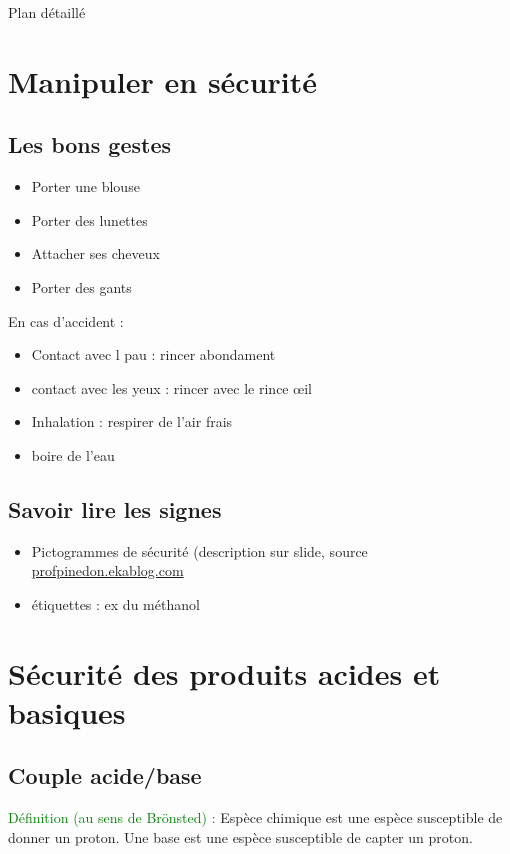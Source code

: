 \begin{reportBlock}{Plan détaillé}
\section{Manipuler en sécurité}

\subsection{Les bons gestes}

\begin{itemize}
    \item Porter une blouse
    \item Porter des lunettes
    \item Attacher ses cheveux
    \item Porter des gants
\end{itemize}

En cas d'accident :
\begin{itemize}
    \item Contact avec l pau : rincer abondament
    \item contact avec les yeux : rincer avec le rince \oe il
    \item Inhalation : respirer de l'air frais
    \item boire de l'eau
\end{itemize}

\subsection{Savoir lire les signes}

\begin{itemize}
    \item Pictogrammes de sécurité (description sur slide, source \url{profpinedon.ekablog.com}
    \item étiquettes : ex du méthanol
\end{itemize}


\section{Sécurité des produits acides et basiques}

\subsection{Couple acide/base}

\textcolor{green}{Définition (au sens de Brönsted) :} Espèce chimique est une espèce susceptible de donner un proton. Une base est une espèce susceptible de capter un proton.\\


\end{reportBlock}
